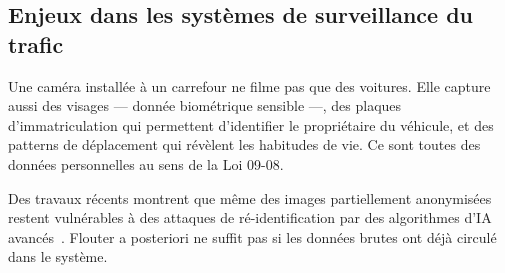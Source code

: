 \subsection{Enjeux dans les systèmes de
            surveillance du trafic}

Une caméra installée à un carrefour ne filme
pas que des voitures. Elle capture aussi des
visages — donnée biométrique sensible —, des
plaques d'immatriculation qui permettent
d'identifier le propriétaire du véhicule,
et des patterns de déplacement qui révèlent
les habitudes de vie. Ce sont toutes des
données personnelles au sens de la Loi 09-08.

Des travaux récents montrent que même des
images partiellement anonymisées restent
vulnérables à des attaques de ré-identification
par des algorithmes d'IA avancés~\cite{razi2025}.
Flouter a posteriori ne suffit pas si les
données brutes ont déjà circulé dans le
système.


